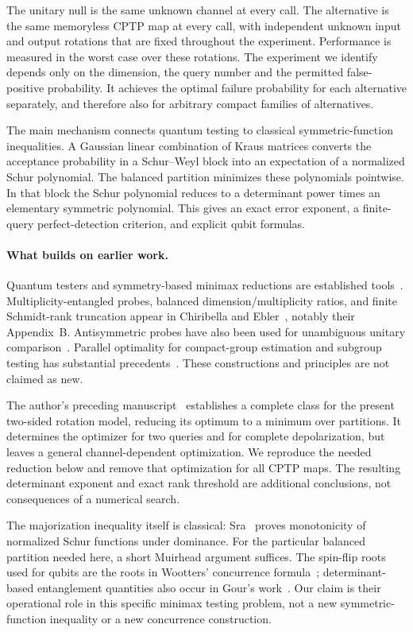 \documentclass[11pt,a4paper]{article}
\theoremstyle{remark}\newtheorem{remark}[theorem]{Remark}
\begin{document}
The unitary null is the same unknown channel at every call. The alternative is the same memoryless CPTP map at every call, with independent unknown input and output rotations that are fixed throughout the experiment. Performance is measured in the worst case over these rotations. The experiment we identify depends only on the dimension, the query number and the permitted false-positive probability. It achieves the optimal failure probability for each alternative separately, and therefore also for arbitrary compact families of alternatives.

The main mechanism connects quantum testing to classical symmetric-function inequalities. A Gaussian linear combination of Kraus matrices converts the acceptance probability in a Schur--Weyl block into an expectation of a normalized Schur polynomial. The balanced partition minimizes these polynomials pointwise. In that block the Schur polynomial reduces to a determinant power times an elementary symmetric polynomial. This gives an exact error exponent, a finite-query perfect-detection criterion, and explicit qubit formulas.

\paragraph{What builds on earlier work.}
Quantum testers and symmetry-based minimax reductions are established tools~\cite{nakahira}. Multiplicity-entangled probes, balanced dimension/multiplicity ratios, and finite Schmidt-rank truncation appear in Chiribella and Ebler~\cite{chiribella}, notably their Appendix~B. Antisymmetric probes have also been used for unambiguous unitary comparison~\cite{sedlak}. Parallel optimality for compact-group estimation and subgroup testing has substantial precedents~\cite{hayashi,hayashi_symmetry}. These constructions and principles are not claimed as new.

The author's preceding manuscript~\cite{complete} establishes a complete class for the present two-sided rotation model, reducing its optimum to a minimum over partitions. It determines the optimizer for two queries and for complete depolarization, but leaves a general channel-dependent optimization. We reproduce the needed reduction below and remove that optimization for all CPTP maps. The resulting determinant exponent and exact rank threshold are additional conclusions, not consequences of a numerical search.

The majorization inequality itself is classical: Sra~\cite{sra} proves monotonicity of normalized Schur functions under dominance. For the particular balanced partition needed here, a short Muirhead argument suffices. The spin-flip roots used for qubits are the roots in Wootters' concurrence formula~\cite{wootters}; determinant-based entanglement quantities also occur in Gour's work~\cite{gour}. Our claim is their operational role in this specific minimax testing problem, not a new symmetric-function inequality or a new concurrence construction.
\end{document}
